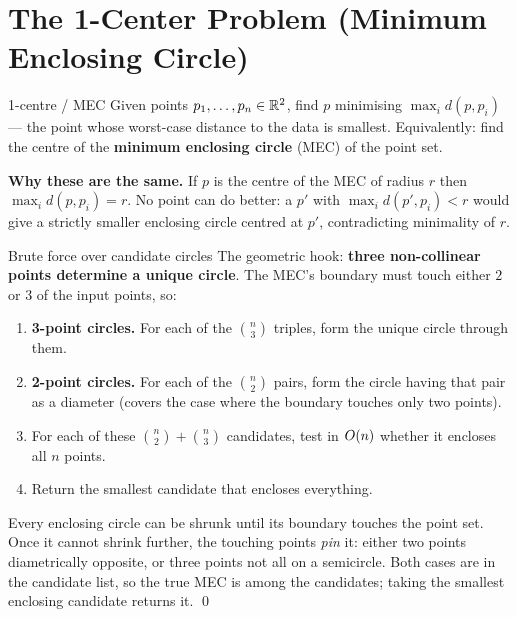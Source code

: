 \section{The 1-Center Problem (Minimum Enclosing Circle)}

\begin{prob}{1-centre / MEC}
Given points $p_1,\dots,p_n\in\mathbb{R}^2$, find $p$ minimising $\max_i d(p,p_i)$ --- the point whose
worst-case distance to the data is smallest. Equivalently: find the centre of the
\textbf{minimum enclosing circle} (MEC) of the point set.
\end{prob}

\noindent\textbf{Why these are the same.} If $p$ is the centre of the MEC of radius $r$ then
$\max_i d(p,p_i)=r$. No point can do better: a $p'$ with $\max_i d(p',p_i)<r$ would give a
strictly smaller enclosing circle centred at $p'$, contradicting minimality of $r$.

\begin{algo}{Brute force over candidate circles}
The geometric hook: \textbf{three non-collinear points determine a unique circle}. The MEC's
boundary must touch either $2$ or $3$ of the input points, so:
\begin{enumerate}
  \item \textbf{3-point circles.} For each of the $\binom n3$ triples, form the unique circle
        through them.
  \item \textbf{2-point circles.} For each of the $\binom n2$ pairs, form the circle having
        that pair as a diameter (covers the case where the boundary touches only two points).
  \item For each of these $\binom n2+\binom n3$ candidates, test in $O(n)$ whether it encloses
        all $n$ points.
  \item Return the smallest candidate that encloses everything.
\end{enumerate}
\end{algo}

\begin{correct}
Every enclosing circle can be shrunk until its boundary touches the point set. Once it cannot
shrink further, the touching points \emph{pin} it: either two points diametrically opposite, or
three points not all on a semicircle. Both cases are in the candidate list, so the true MEC is
among the candidates; taking the smallest enclosing candidate returns it. \qed
\end{correct}

